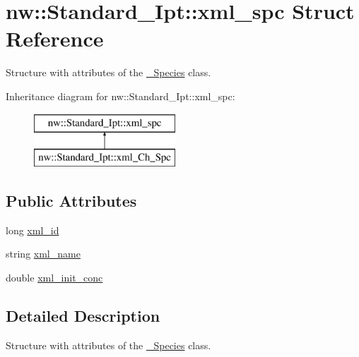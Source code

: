 \hypertarget{structnw_1_1_standard___ipt_1_1xml__spc}{\section{nw\+:\+:Standard\+\_\+\+Ipt\+:\+:xml\+\_\+spc Struct Reference}
\label{structnw_1_1_standard___ipt_1_1xml__spc}
}


Structure with attributes of the \hyperlink{classnw_1_1___species}{\+\_\+\+Species} class.  


Inheritance diagram for nw\+:\+:Standard\+\_\+\+Ipt\+:\+:xml\+\_\+spc\+:\begin{figure}[H]
\begin{center}
\leavevmode
\includegraphics[height=2.000000cm]{df/d8c/structnw_1_1_standard___ipt_1_1xml__spc}
\end{center}
\end{figure}
\subsection*{Public Attributes}
\begin{DoxyCompactItemize}
\item 
long \hyperlink{structnw_1_1_standard___ipt_1_1xml__spc_a2928ff822d6fd953e125ec3d8dd741d9}{xml\+\_\+id}
\item 
string \hyperlink{structnw_1_1_standard___ipt_1_1xml__spc_a2b1626e44822991931ca0dfd7257c95f}{xml\+\_\+name}
\item 
double \hyperlink{structnw_1_1_standard___ipt_1_1xml__spc_a1ae4e41f07db5f76deb50901ee12dc2e}{xml\+\_\+init\+\_\+conc}
\end{DoxyCompactItemize}


\subsection{Detailed Description}
Structure with attributes of the \hyperlink{classnw_1_1___species}{\+\_\+\+Species} class. 

